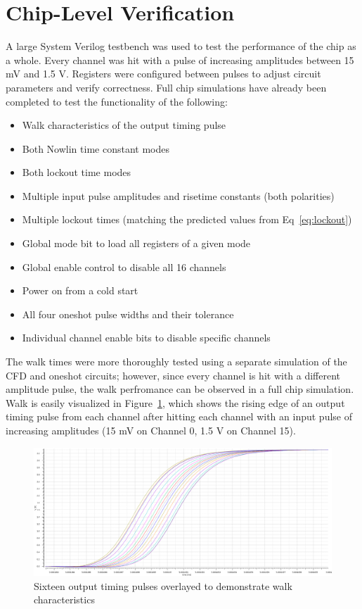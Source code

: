 \documentclass[12pt,oneside,final]{siuethesis}
\theoremstyle{definition}
\begin{document}
\section{Chip-Level Verification}
\par A large System Verilog testbench was used to test the performance of the chip as a whole. Every channel was hit with a pulse of increasing amplitudes between 15 mV and 1.5 V. Registers were configured between pulses to adjust circuit parameters and verify correctness. Full chip simulations have already been completed to test the functionality of the following:

\begin{itemize}
\item Walk characteristics of the output timing pulse
\item Both Nowlin time constant modes
\item Both lockout time modes
\item Multiple input pulse amplitudes and risetime constants (both polarities)
\item Multiple lockout times (matching the predicted values from Eq~\ref{eq:lockout})
\item Global mode bit to load all registers of a given mode
\item Global enable control to disable all 16 channels
\item Power on from a cold start
\item All four oneshot pulse widths and their tolerance
\item Individual channel enable bits to disable specific channels
\end{itemize}

\par The walk times were more thoroughly tested using a separate simulation of the CFD and oneshot circuits; however, since every channel is hit with a different amplitude pulse, the walk perfromance can be observed in a full chip simulation. Walk is easily visualized in Figure~\ref{fig:walk-plot}, which shows the rising edge of an output timing pulse from each channel after hitting each channel with an input pulse of increasing amplitudes (15 mV on Channel 0, 1.5 V on Channel 15). 

\begin{figure}[htbp!]
 \centering
 \includegraphics[scale=.42, angle = 90]{./ch4_figures/walk_plot.png}
 \caption{Sixteen output timing pulses overlayed to demonstrate walk characteristics}
 \label{fig:walk-plot}
\end{figure} 
\end{document}
